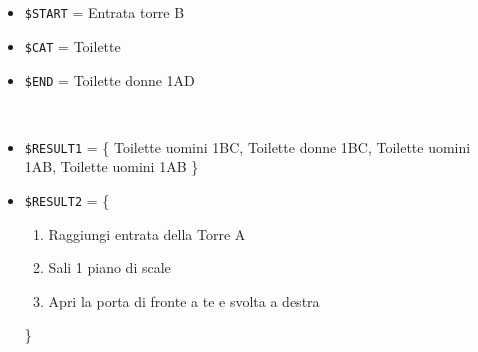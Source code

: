 \documentclass[../../SperimentazioniPratiche.tex]{subfiles}
\begin{document}
			\paragraph*{}
			\label{Prova1B.1}		
			\begin{tcolorbox}[fonttitle=\bfseries, 
								adjusted title={\Large Prova 1B.1}, 
								breakable, 
								sharp corners=south,
								colback=white, 
								colframe=white!60!black]
								
				\begin{description}[leftmargin=0.7cm,labelwidth=!]
				
					\item[Input] \ \par 
        				\begin{itemize}
        					\item \verb|$START| = Entrata torre B
        					\item \verb|$CAT| = Toilette
							\item \verb|$END| = Toilette donne 1AD
        				\end{itemize}
        				
        			\tcbline 
        				
        			\item[Output atteso] \ \par
        				\begin{itemize}
							
							\item \verb|$RESULT1| = \{
								Toilette uomini 1BC, Toilette donne 1BC, Toilette uomini 1AB, Toilette uomini 1AB
							\}         				
        				
        					\item \verb|$RESULT2| = \{
        					\begin{enumerate}
        						\item Raggiungi entrata della Torre A
								\item Sali 1 piano di scale
								\item Apri la porta di fronte a te e svolta a destra
        					\end{enumerate}
        					\}
        					       					
        					
        				\end{itemize}

					\tcbline        				
        				
        			\item[Output riscontrato] \ \par
        				\begin{description}
        				

\end{description}
\end{description}
\end{tcolorbox}
\end{document}
